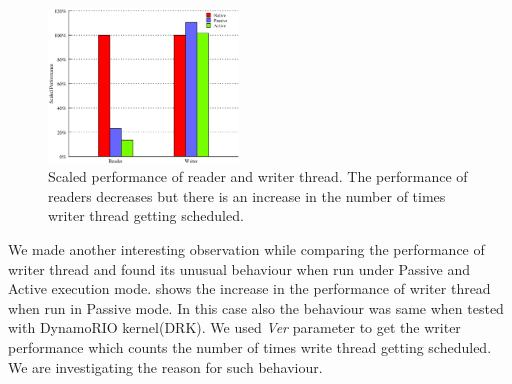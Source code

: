 \begin{figure}
\centering
 	\includegraphics[width=0.45\textwidth]{rcu}
\caption{Scaled performance of reader and writer thread. The performance of readers decreases but there is an increase in the number of times writer thread getting scheduled.}\label{fig:reader-writer}
\end{figure}
We made another interesting observation while comparing the performance of writer thread and found its unusual behaviour when run under Passive and Active execution mode.  shows the increase in the performance of writer thread when run in Passive mode. In this case also the behaviour was same when tested with DynamoRIO kernel(DRK). We used \emph{Ver} parameter to get the writer performance which counts the number of times write thread getting scheduled. We are investigating the reason for such behaviour. 


